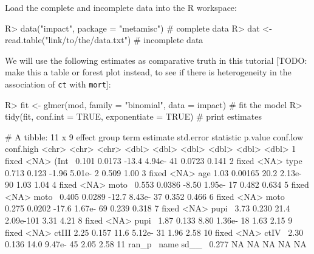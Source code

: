 \documentclass[
]{jss}
\begin{document}
Load the complete and incomplete data into the R workspace:

\begin{CodeChunk}
\begin{CodeInput}
R> data("impact", package = "metamisc")      # complete data
R> dat <- read.table("link/to/the/data.txt") # incomplete data
\end{CodeInput}
\end{CodeChunk}

We will use the following estimates as comparative truth in this
tutorial {[}TODO: make this a table or forest plot instead, to see if
there is heterogeneity in the association of \texttt{ct} with
\texttt{mort}{]}:

\begin{CodeChunk}
\begin{CodeInput}
R> fit <- glmer(mod, family = "binomial", data = impact) # fit the model
R> tidy(fit, conf.int = TRUE, exponentiate = TRUE)       # print estimates
\end{CodeInput}
\begin{CodeOutput}
# A tibble: 11 x 9
   effect group term  estimate std.error statistic    p.value conf.low conf.high
   <chr>  <chr> <chr>    <dbl>     <dbl>     <dbl>      <dbl>    <dbl>     <dbl>
 1 fixed  <NA>  (Int~    0.101   0.0173     -13.4   4.94e- 41   0.0723     0.141
 2 fixed  <NA>  type~    0.713   0.123       -1.96  5.01e-  2   0.509      1.00 
 3 fixed  <NA>  age      1.03    0.00165     20.2   2.13e- 90   1.03       1.04 
 4 fixed  <NA>  moto~    0.553   0.0386      -8.50  1.95e- 17   0.482      0.634
 5 fixed  <NA>  moto~    0.405   0.0289     -12.7   8.43e- 37   0.352      0.466
 6 fixed  <NA>  moto~    0.275   0.0202     -17.6   1.67e- 69   0.239      0.318
 7 fixed  <NA>  pupi~    3.73    0.230       21.4   2.09e-101   3.31       4.21 
 8 fixed  <NA>  pupi~    1.87    0.133        8.80  1.36e- 18   1.63       2.15 
 9 fixed  <NA>  ctIII    2.25    0.157       11.6   5.12e- 31   1.96       2.58 
10 fixed  <NA>  ctIV~    2.30    0.136       14.0   9.47e- 45   2.05       2.58 
11 ran_p~ name  sd__~    0.277  NA           NA    NA          NA         NA    
\end{CodeOutput}
\end{CodeChunk}
\end{document}
